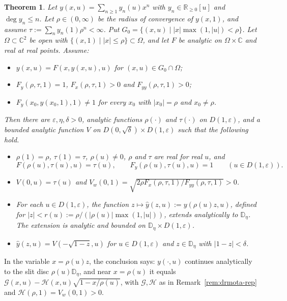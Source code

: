 \documentclass[11pt]{amsart}
\newtheorem{theorem}{Theorem}[section]
\theoremstyle{definition}
\theoremstyle{remark}
\numberwithin{equation}{section}
\newcommand{\CC}{\mathbb{C}}
\newcommand{\RR}{\mathbb{R}}
\newcommand{\DD}{\mathbb{D}}
\newcommand{\abs}[1]{\lvert #1\rvert}
\begin{document}
\begin{theorem}\label{thm:unif}
Let \(y(x,u)=\sum_{n\ge1}y_n(u)x^n\) with \(y_n\in\RR_{\ge0}[u]\) and \(\deg y_n\le n\). Let \(\rho\in(0,\infty)\) be the radius of convergence of \(y(x,1)\), and assume \(\tau:=\sum_ny_n(1)\rho^n<\infty\). Put \(G_0=\{(x,u)\mid\abs{x}\max(1,\abs{u})<\rho\}\). Let \(\Omega\subset\CC^2\) be open with \(\{(x,1)\mid\abs{x}\le\rho\}\subset\Omega\), and let \(F\) be analytic on \(\Omega\times\CC\) and real at real points. Assume:
\begin{itemize}
\item[(H1)] \(y(x,u)=F(x,y(x,u),u)\) for \((x,u)\in G_0\cap\Omega\);
\item[(H2)] \(F_y(\rho,\tau,1)=1\), \(F_x(\rho,\tau,1)>0\) and \(F_{yy}(\rho,\tau,1)>0\);
\item[(H3)] \(F_y(x_0,y(x_0,1),1)\ne1\) for every \(x_0\) with \(\abs{x_0}=\rho\) and \(x_0\ne\rho\).
\end{itemize}
Then there are \(\varepsilon,\eta,\delta>0\), analytic functions \(\rho(\cdot)\) and \(\tau(\cdot)\) on \(D(1,\varepsilon)\), and a bounded analytic function \(V\) on \(D(0,\sqrt\delta)\times D(1,\varepsilon)\) such that the following hold.
\begin{itemize}
\item[(a)] \(\rho(1)=\rho\), \(\tau(1)=\tau\), \(\rho(u)\ne0\), \(\rho\) and \(\tau\) are real for real \(u\), and
\begin{equation}\label{eq:charsys}
F(\rho(u),\tau(u),u)=\tau(u),\qquad F_y(\rho(u),\tau(u),u)=1\qquad(u\in D(1,\varepsilon)).
\end{equation}
\item[(b)] \(V(0,u)=\tau(u)\) and \(V_w(0,1)=\sqrt{2\rho F_x(\rho,\tau,1)/F_{yy}(\rho,\tau,1)}>0\).
\item[(c)] For each \(u\in D(1,\varepsilon)\), the function \(z\mapsto\hat y(z,u):=y(\rho(u)z,u)\), defined for \(\abs{z}<r(u):=\rho/(\abs{\rho(u)}\max(1,\abs{u}))\), extends analytically to \(\DD_\eta\). The extension is analytic and bounded on \(\DD_\eta\times D(1,\varepsilon)\).
\item[(d)] \(\hat y(z,u)=V(-\sqrt{1-z},u)\) for \(u\in D(1,\varepsilon)\) and \(z\in\DD_\eta\) with \(\abs{1-z}<\delta\).
\end{itemize}
\end{theorem}

In the variable \(x=\rho(u)z\), the conclusion says: \(y(\cdot,u)\) continues analytically to the slit disc \(\rho(u)\DD_\eta\), and near \(x=\rho(u)\) it equals \(\mathcal{G}(x,u)-\mathcal{H}(x,u)\sqrt{1-x/\rho(u)}\), with \(\mathcal{G},\mathcal{H}\) as in Remark~\ref{rem:drmota-rep} and \(\mathcal{H}(\rho,1)=V_w(0,1)>0\).
\end{document}
